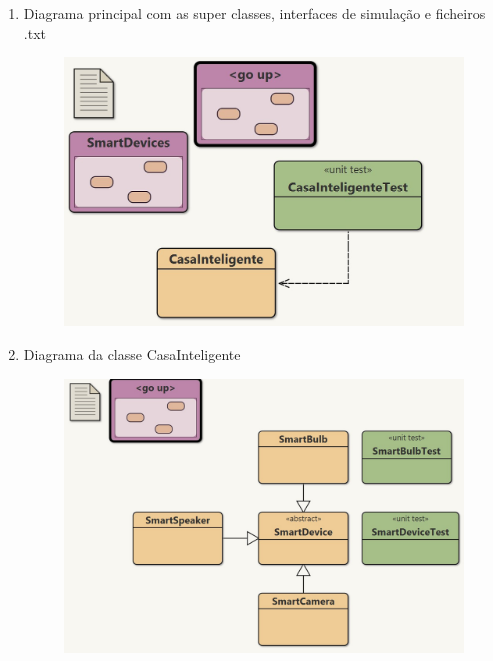 \documentclass[11pt,a4paper]{report}
\begin{document}
\begin{enumerate}
    \item Diagrama principal com as super classes, interfaces de simulação e ficheiros .txt
    \vspace{13mm} %

	\begin{figure}[H]
			\includegraphics[scale=0.8]{diagrama2.jpg}
	\end{figure}
	
\item Diagrama da classe CasaInteligente
\vspace{15mm} %

	\begin{figure}[H]
    		\includegraphics[scale=0.8]{diagrama3.jpg}
    \end{figure}
    

\end{enumerate}
\end{document}
